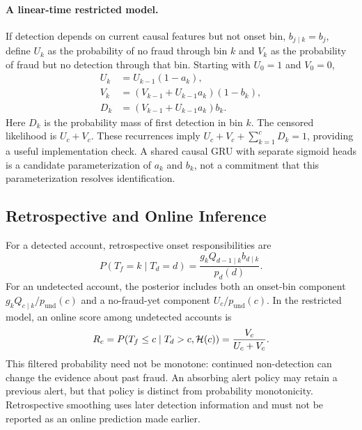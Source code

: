 \paragraph{A linear-time restricted model.}
If detection depends on current causal features but not onset bin,
$b_{j\mid k}=b_j$, define $U_k$ as the probability of no fraud through bin $k$
and $V_k$ as the probability of fraud but no detection through that bin.
Starting with $U_0=1$ and $V_0=0$,
\begin{align}
 U_k&=U_{k-1}(1-a_k),\\
 V_k&=(V_{k-1}+U_{k-1}a_k)(1-b_k),\\
 D_k&=(V_{k-1}+U_{k-1}a_k)b_k.
\end{align}
Here $D_k$ is the probability mass of first detection in bin $k$.
The censored likelihood is $U_c+V_c$. These recurrences imply
$U_c+V_c+\sum_{k=1}^cD_k=1$, providing a useful implementation check.
A shared causal GRU with separate sigmoid heads is a candidate
parameterization of $a_k$ and $b_k$, not a commitment that this
parameterization resolves identification.

\subsection{Retrospective and Online Inference}
For a detected account, retrospective onset responsibilities are
\begin{equation}
 P(T_f=k\mid T_d=d)
 =\frac{g_k Q_{d-1\mid k}b_{d\mid k}}{p_d(d)}.
\end{equation}
For an undetected account, the posterior includes both an onset-bin
component $g_kQ_{c\mid k}/p_{\mathrm{und}}(c)$ and a no-fraud-yet component
$U_c/p_{\mathrm{und}}(c)$.
In the restricted model, an online score among undetected accounts is
\begin{equation}
 R_c=P(T_f\le c\mid T_d>c,\mathcal{H}(c))=\frac{V_c}{U_c+V_c}.
\end{equation}
This filtered probability need not be monotone: continued non-detection can
change the evidence about past fraud. An absorbing alert policy may retain a
previous alert, but that policy is distinct from probability monotonicity.
Retrospective smoothing uses later detection information and must not be
reported as an online prediction made earlier.
